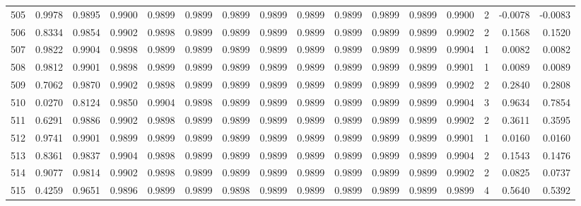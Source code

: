 \begin{tabular}{lrrrrrrrrrrrrrrr}
505 &      0.9978 &  0.9895 &  0.9900 &  0.9899 &  0.9899 &  0.9899 &  0.9899 &  0.9899 &  0.9899 &  0.9899 &   0.9899 &     0.9900 &      2 &                   -0.0078 &                    -0.0083 \\
506 &      0.8334 &  0.9854 &  0.9902 &  0.9898 &  0.9899 &  0.9899 &  0.9899 &  0.9899 &  0.9899 &  0.9899 &   0.9899 &     0.9902 &      2 &                    0.1568 &                     0.1520 \\
507 &      0.9822 &  0.9904 &  0.9898 &  0.9899 &  0.9899 &  0.9899 &  0.9899 &  0.9899 &  0.9899 &  0.9899 &   0.9899 &     0.9904 &      1 &                    0.0082 &                     0.0082 \\
508 &      0.9812 &  0.9901 &  0.9898 &  0.9899 &  0.9899 &  0.9899 &  0.9899 &  0.9899 &  0.9899 &  0.9899 &   0.9899 &     0.9901 &      1 &                    0.0089 &                     0.0089 \\
509 &      0.7062 &  0.9870 &  0.9902 &  0.9898 &  0.9899 &  0.9899 &  0.9899 &  0.9899 &  0.9899 &  0.9899 &   0.9899 &     0.9902 &      2 &                    0.2840 &                     0.2808 \\
510 &      0.0270 &  0.8124 &  0.9850 &  0.9904 &  0.9898 &  0.9899 &  0.9899 &  0.9899 &  0.9899 &  0.9899 &   0.9899 &     0.9904 &      3 &                    0.9634 &                     0.7854 \\
511 &      0.6291 &  0.9886 &  0.9902 &  0.9898 &  0.9899 &  0.9899 &  0.9899 &  0.9899 &  0.9899 &  0.9899 &   0.9899 &     0.9902 &      2 &                    0.3611 &                     0.3595 \\
512 &      0.9741 &  0.9901 &  0.9899 &  0.9899 &  0.9899 &  0.9899 &  0.9899 &  0.9899 &  0.9899 &  0.9899 &   0.9899 &     0.9901 &      1 &                    0.0160 &                     0.0160 \\
513 &      0.8361 &  0.9837 &  0.9904 &  0.9898 &  0.9899 &  0.9899 &  0.9899 &  0.9899 &  0.9899 &  0.9899 &   0.9899 &     0.9904 &      2 &                    0.1543 &                     0.1476 \\
514 &      0.9077 &  0.9814 &  0.9902 &  0.9898 &  0.9899 &  0.9899 &  0.9899 &  0.9899 &  0.9899 &  0.9899 &   0.9899 &     0.9902 &      2 &                    0.0825 &                     0.0737 \\
515 &      0.4259 &  0.9651 &  0.9896 &  0.9899 &  0.9899 &  0.9898 &  0.9899 &  0.9899 &  0.9899 &  0.9899 &   0.9899 &     0.9899 &      4 &                    0.5640 &                     0.5392 \\

\end{tabular}

